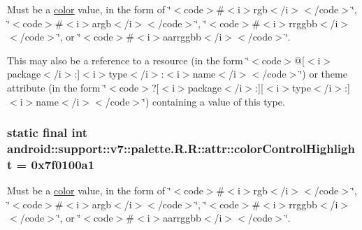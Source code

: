 Must be a \hyperlink{classandroid_1_1support_1_1v7_1_1palette_1_1_r_1_1color}{color} value, in the form of \char`\"{}$<$code$>$\#$<$i$>$rgb$<$/i$>$$<$/code$>$\char`\"{}, \char`\"{}$<$code$>$\#$<$i$>$argb$<$/i$>$$<$/code$>$\char`\"{}, \char`\"{}$<$code$>$\#$<$i$>$rrggbb$<$/i$>$$<$/code$>$\char`\"{}, or \char`\"{}$<$code$>$\#$<$i$>$aarrggbb$<$/i$>$$<$/code$>$\char`\"{}. 

This may also be a reference to a resource (in the form \char`\"{}$<$code$>$@\mbox{[}$<$i$>$package$<$/i$>$:\mbox{]}$<$i$>$type$<$/i$>$:$<$i$>$name$<$/i$>$$<$/code$>$\char`\"{}) or theme attribute (in the form \char`\"{}$<$code$>$?\mbox{[}$<$i$>$package$<$/i$>$:\mbox{]}\mbox{[}$<$i$>$type$<$/i$>$:\mbox{]}$<$i$>$name$<$/i$>$$<$/code$>$\char`\"{}) containing a value of this type. \hypertarget{classandroid_1_1support_1_1v7_1_1palette_1_1_r_1_1attr_49ef792e4bf017d2be51143a08b86248}{
\subsubsection[{colorControlHighlight}]{\setlength{\rightskip}{0pt plus 5cm}static final int android::support::v7::palette.R.R::attr::colorControlHighlight = 0x7f0100a1}}
\label{classandroid_1_1support_1_1v7_1_1palette_1_1_r_1_1attr_49ef792e4bf017d2be51143a08b86248}


Must be a \hyperlink{classandroid_1_1support_1_1v7_1_1palette_1_1_r_1_1color}{color} value, in the form of \char`\"{}$<$code$>$\#$<$i$>$rgb$<$/i$>$$<$/code$>$\char`\"{}, \char`\"{}$<$code$>$\#$<$i$>$argb$<$/i$>$$<$/code$>$\char`\"{}, \char`\"{}$<$code$>$\#$<$i$>$rrggbb$<$/i$>$$<$/code$>$\char`\"{}, or \char`\"{}$<$code$>$\#$<$i$>$aarrggbb$<$/i$>$$<$/code$>$\char`\"{}. 

